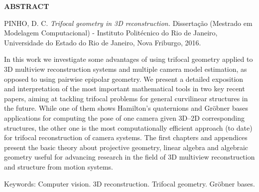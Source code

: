\begin{center}
{\bf ABSTRACT}
\end{center}

\vspace{1 cm}

\begin{center}
\begin{minipage}{1\textwidth}
\noindent PINHO, D. C. {\it Trifocal geometry in 3D reconstruction.} Dissertação (Mestrado em Modelagem Computacional) - Instituto Politécnico do Rio de Janeiro, Universidade do Estado do Rio de Janeiro, Nova Friburgo, 2016.
\end{minipage}
\end{center}

\vspace{1 cm}

\begin{center}
\begin{minipage}{1\textwidth}
\qquad In this work we investigate some advantages of using trifocal geometry applied to 3D multiview reconstruction systems and multiple camera model estimation, as opposed to using pairwise epipolar geometry. We present a detailed exposition and interpretation of the most important mathematical tools in two key recent papers, aiming at tackling trifocal problems for general curvilinear structures in the future. While one of them shows Hamilton's quaternions and Gr\"obner bases applications for computing the pose of one camera given 3D--2D corresponding structures, the other one is the most computationally efficient approach (to date) for trifocal reconstruction of camera systems. The first chapters and appendices present the basic theory about projective geometry, linear algebra and algebraic geometry useful for advancing research in the field of 3D multiview reconstruction and structure from motion systems.
\end{minipage}
\end{center}
 
\vspace{1 cm}

\begin{flushleft}
Keywords: Computer vision. 3D reconstruction. Trifocal geometry. Gr\"obner bases. 
\end{flushleft}

\newpage